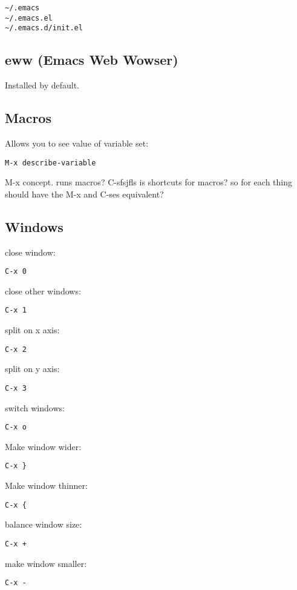 \begin{verbatim}
~/.emacs
~/.emacs.el
~/.emacs.d/init.el
\end{verbatim}
  
\subsection{eww (Emacs Web Wowser)}

Installed by default.

\subsection{Macros}
Allows you to see value of variable set:

\begin{verbatim}
M-x describe-variable
\end{verbatim}


M-x concept. runs macros?
C-sfsjfls is shortcuts for macros? so for each thing should have the M-x and C-ses equivalent?



\subsection{Windows}

close window:
\begin{verbatim}
C-x 0
\end{verbatim}
close other windows:
\begin{verbatim}
C-x 1
\end{verbatim}
split on x axis:
\begin{verbatim}
C-x 2
\end{verbatim}
split on y axis:
\begin{verbatim}
C-x 3
\end{verbatim}
switch windows:
\begin{verbatim}
C-x o
\end{verbatim}
Make window wider:
\begin{verbatim}
C-x }
\end{verbatim}
Make window thinner:
\begin{verbatim}
C-x {
\end{verbatim}
balance window size:
\begin{verbatim}
C-x +
\end{verbatim}
make window smaller:
\begin{verbatim}
C-x -
\end{verbatim}

